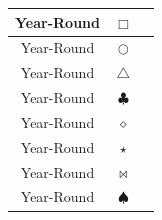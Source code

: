 \documentclass[10pt]{article}
\begin{document}
\vspace{-.5cm}
\begin{tabular}{|c|c|c|}
\hline
{\color{red} Year-Round} & $\Box$ & \\
\hline
{\color{green} Year-Round} & $\bigcirc$ & \\
\hline
{\color{yellow} Year-Round} & $\triangle$ & \\
\hline
{\color{brown} Year-Round} & $\clubsuit$ & \\
\hline
{\color{orange} Year-Round} & $\diamond$ & \\
\hline
{\color{purple} Year-Round} & $\star$ & \\
\hline
{\color{pink} Year-Round} & $\bowtie$ & \\
\hline
{\color{blue} Year-Round} & $\spadesuit$ \\
\hline
\end{tabular}
\end{document}
